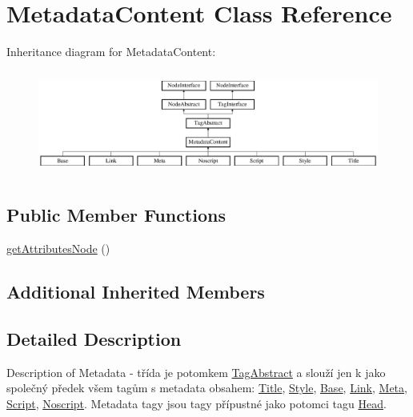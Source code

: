 \hypertarget{class_pes_1_1_dom_1_1_node_1_1_tag_1_1_metadata_content}{}\section{Metadata\+Content Class Reference}
\label{class_pes_1_1_dom_1_1_node_1_1_tag_1_1_metadata_content}
Inheritance diagram for Metadata\+Content\+:\begin{figure}[H]
\begin{center}
\leavevmode
\includegraphics[height=3.478261cm]{class_pes_1_1_dom_1_1_node_1_1_tag_1_1_metadata_content}
\end{center}
\end{figure}
\subsection*{Public Member Functions}
\begin{DoxyCompactItemize}
\item 
\mbox{\hyperlink{class_pes_1_1_dom_1_1_node_1_1_tag_1_1_metadata_content_a4722e7722b245351681b05d35f6694f3}{get\+Attributes\+Node}} ()
\end{DoxyCompactItemize}
\subsection*{Additional Inherited Members}


\subsection{Detailed Description}
Description of Metadata -\/ třída je potomkem \mbox{\hyperlink{class_pes_1_1_dom_1_1_node_1_1_tag_1_1_tag_abstract}{Tag\+Abstract}} a slouží jen k jako společný předek všem tagům s metadata obsahem\+: \mbox{\hyperlink{class_pes_1_1_dom_1_1_node_1_1_tag_1_1_title}{Title}}, \mbox{\hyperlink{class_pes_1_1_dom_1_1_node_1_1_tag_1_1_style}{Style}}, \mbox{\hyperlink{class_pes_1_1_dom_1_1_node_1_1_tag_1_1_base}{Base}}, \mbox{\hyperlink{class_pes_1_1_dom_1_1_node_1_1_tag_1_1_link}{Link}}, \mbox{\hyperlink{class_pes_1_1_dom_1_1_node_1_1_tag_1_1_meta}{Meta}}, \mbox{\hyperlink{class_pes_1_1_dom_1_1_node_1_1_tag_1_1_script}{Script}}, \mbox{\hyperlink{class_pes_1_1_dom_1_1_node_1_1_tag_1_1_noscript}{Noscript}}. Metadata tagy jsou tagy přípustné jako potomci tagu \mbox{\hyperlink{class_pes_1_1_dom_1_1_node_1_1_tag_1_1_head}{Head}}.

